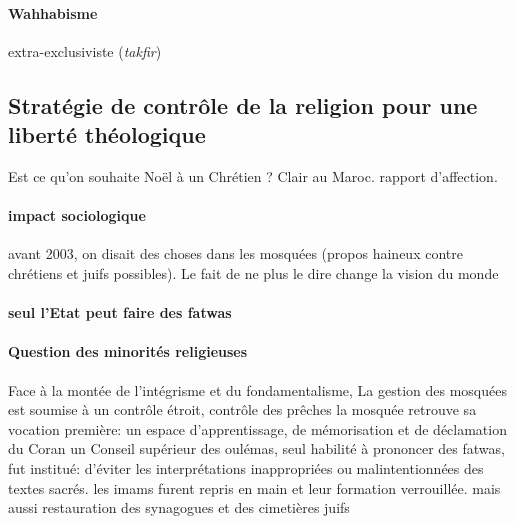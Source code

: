 \paragraph{Wahhabisme} extra-exclusiviste (\textit{takfir})




\subsection{Stratégie de contrôle de la religion pour une liberté théologique}



\begin{Ex}
    Est ce qu'on souhaite Noël à un Chrétien ? Clair au Maroc. rapport d'affection. 
\end{Ex}



\paragraph{impact sociologique} avant 2003, on disait des choses dans les mosquées (propos haineux contre chrétiens et juifs possibles). Le fait de ne plus le dire change la vision du monde 



 \paragraph{seul l'Etat peut faire des fatwas}




 \paragraph{Question des minorités religieuses}



 Face à la montée de l'intégrisme et du fondamentalisme, La gestion des mosquées est soumise à un contrôle étroit, contrôle des prêches   la mosquée retrouve sa vocation première: un espace d'apprentissage, de mémorisation et de déclamation du Coran un Conseil supérieur des oulémas, seul habilité à prononcer des fatwas, fut institué:
d'éviter les
interprétations inappropriées ou malintentionnées des textes sacrés.
  les imams furent repris en main et leur formation verrouillée.
  mais aussi restauration des synagogues et des cimetières juifs

